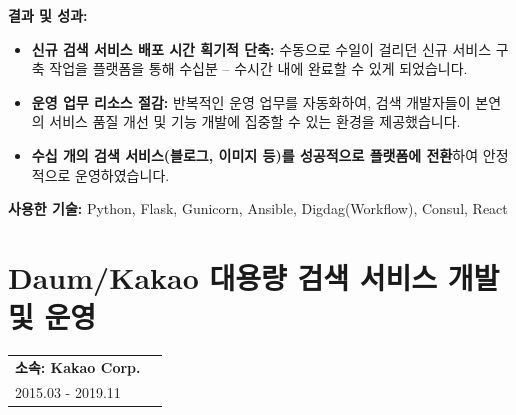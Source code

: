 \documentclass[letterpaper,11pt]{article}
\makeatletter
\newcommand{\resumeProject}[2]{
  \vspace{-1pt}\item
    \begin{tabular*}{0.97\textwidth}[t]{l@{\extracolsep{\fill}}r}
      \textbf{#1} \\
      \small{#2} \\
    \end{tabular*}\vspace{-5pt}
}
\makeatother
\begin{document}
{      %
      \textbf{결과 및 성과:}
      \begin{itemize}[leftmargin=*]
          \item \textbf{신규 검색 서비스 배포 시간 획기적 단축:} 수동으로 수일이 걸리던 신규 서비스 구축 작업을 플랫폼을 통해 수십분 -- 수시간 내에 완료할 수 있게 되었습니다.
          \item \textbf{운영 업무 리소스 절감:} 반복적인 운영 업무를 자동화하여, 검색 개발자들이 본연의 서비스 품질 개선 및 기능 개발에 집중할 수 있는 환경을 제공했습니다.
          \item \textbf{수십 개의 검색 서비스(블로그, 이미지 등)를 성공적으로 플랫폼에 전환}하여 안정적으로 운영하였습니다.
      \end{itemize}

      \textbf{사용한 기술:} Python, Flask, Gunicorn, Ansible, Digdag(Workflow), Consul, React
    }
  \resumeProjectListEnd

\section{\textbf{Daum/Kakao 대용량 검색 서비스 개발 및 운영}}
  \resumeProjectListStart
    \resumeProject
    {\textbf{소속}: Kakao Corp.} {2015.03 - 2019.11}
\end{document}
